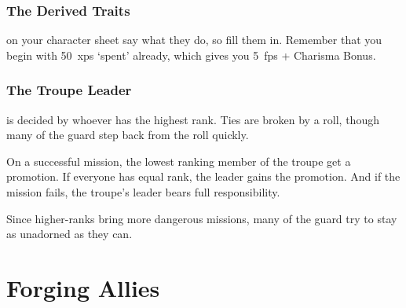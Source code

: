 \begin{multicols}{2}
\begin{multicols}{2}
\end{multicols}

\commonArmourChart

\commonWeaponsChart %
\label{commonWeapons}

\subsubsection{The Derived Traits}
on your character sheet say what they do, so fill them in.
Remember that you begin with 50~\glspl{xp} `spent' already, which gives you 5~\glspl{fp} + Charisma Bonus.

\subsubsection{The Troupe Leader}
is decided by whoever has the highest rank.
Ties are broken by a  roll, though many of the \gls{guard} step back from the roll quickly.

On a successful mission, the lowest ranking member of the troupe get a promotion.
If everyone has equal rank, the leader gains the promotion.
And if the mission fails, the troupe's leader bears full responsibility.

Since higher-ranks bring more dangerous missions, many of the \gls{guard} try to stay as unadorned as they can.

\end{multicols}

\section{Forging Allies}

\glsresetall

